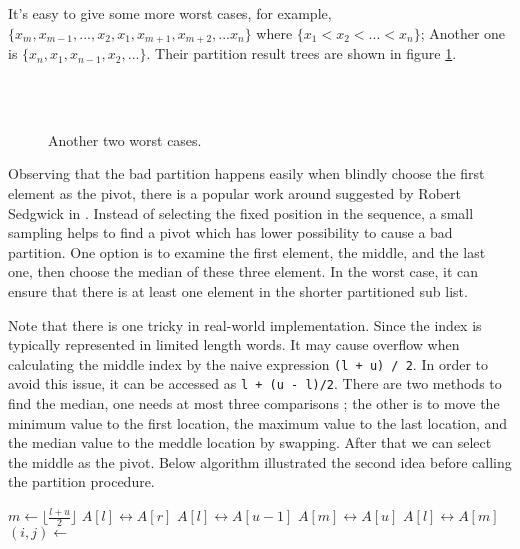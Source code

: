 \documentclass[UTF8]{article}
\begin{document}
It's easy to give some more worst cases, for example, $\{ x_m, x_{m-1}, ..., x_2, x_1, x_{m+1}, x_{m+2}, ... x_n\}$
where $\{ x_1 < x_2 < ... < x_n \}$;
Another one is $\{x_n, x_1, x_{n-1}, x_2, ... \}$. Their partition result trees are shown
in figure \ref{fig:worst-cases-2}.

\begin{figure}[htbp]
   \centering
    \\
    \\
   \caption{Another two worst cases.}
   \label{fig:worst-cases-2}
\end{figure}

Observing that the bad partition happens easily when blindly choose the first element as the pivot,
there is a popular work around suggested by Robert Sedgwick in \cite{qsort-impl}. Instead of
selecting the fixed position in the sequence, a small sampling helps to find a pivot which
has lower possibility to cause a bad partition. One option is to examine the first element, the
middle, and the last one, then choose the median of these three element. In the worst case,
it can ensure that there is at least one element in the shorter partitioned sub list.

Note that there is one tricky in real-world implementation. Since the index is typically represented
in limited length words. It may cause overflow when calculating the middle index by
the naive expression \verb|(l + u) / 2|. In order to avoid this issue, it can be accessed
as \verb|l + (u - l)/2|. There are two methods to find the median, one needs at most three
comparisons \cite{3-way-part}; the other is to move the minimum value to the first location, the maximum value
to the last location, and the median value to the meddle location by swapping. After that
we can select the middle as the pivot.
Below algorithm illustrated the second idea before calling the partition procedure.

\begin{algorithmic}[1]
    \State $m \gets \lfloor \frac{l + u}{2} \rfloor$ 
     
      \State {} $A[l] \leftrightarrow A[r]$
    \EndIf
     
      \State {} $A[l] \leftrightarrow A[u-1]$
    \EndIf
     
      \State {} $A[m] \leftrightarrow A[u]$
    \EndIf
    \State {} $A[l] \leftrightarrow A[m]$
    \State $(i, j) \gets $ 
    \State {}
    \State {}
  \EndIf
\EndProcedure
\end{algorithmic}
\end{document}
